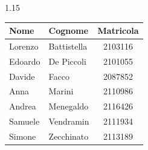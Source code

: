 \documentclass[a4paper, 11pt]{article}
\begin{document}
\begin{spacing}{1.15}
\begin{center}
    \begin{tabular}{|l|l|c|}
        \hline
        \textbf{Nome} & \textbf{Cognome} & \textbf{Matricola} \\
        \hline
        Lorenzo & Battistella & 2103116 \\
        Edoardo & De Piccoli &  2101055 \\
        Davide & Facco &        2087852 \\
        Anna & Marini &         2110986 \\
        Andrea & Menegaldo &    2116426 \\
        Samuele & Vendramin &   2111934 \\
        Simone & Zecchinato &   2113189 \\
        \hline
    \end{tabular}
\end{center}

\end{spacing}
\end{document}
